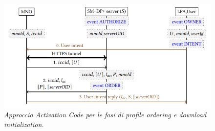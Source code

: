 \documentclass[10pt, oneside]{book}
\begin{document}
\begin{figure}
\includegraphics[width=\linewidth]{activation-code.png}
\caption{\textit{Approccio Activation Code per le fasi di profile ordering e download initialization.}}
\label{fig:activation-code}
\end{figure}
\end{document}
